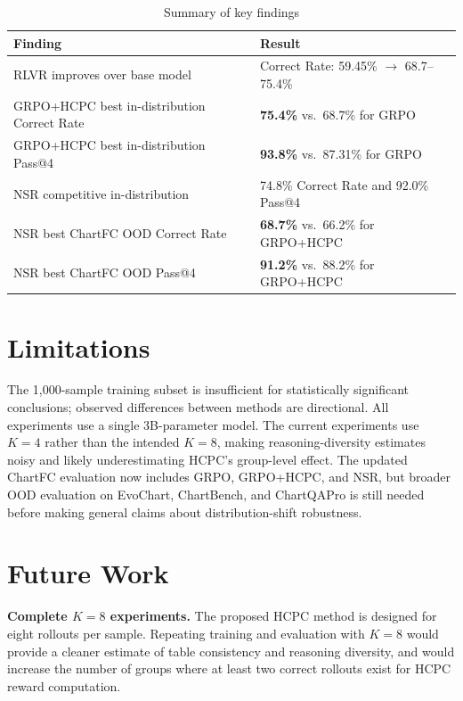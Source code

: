 \documentclass{iutbscthesis}
\begin{document}
\begin{table}[H]
    \centering
    \begin{tabular}{ll}
        \toprule
        Finding & Result \\
        \midrule
        RLVR improves over base model & Correct Rate: 59.45\% $\rightarrow$ 68.7--75.4\% \\
        GRPO+HCPC best in-distribution Correct Rate & \textbf{75.4\%} vs.\ 68.7\% for GRPO \\
        GRPO+HCPC best in-distribution Pass@4 & \textbf{93.8\%} vs.\ 87.31\% for GRPO \\
        NSR competitive in-distribution & 74.8\% Correct Rate and 92.0\% Pass@4 \\
        NSR best ChartFC OOD Correct Rate & \textbf{68.7\%} vs.\ 66.2\% for GRPO+HCPC \\
        NSR best ChartFC OOD Pass@4 & \textbf{91.2\%} vs.\ 88.2\% for GRPO+HCPC \\
        \bottomrule
    \end{tabular}
    \caption{Summary of key findings}
    \label{tab:summary}
\end{table}

\section{Limitations}

The 1,000-sample training subset is insufficient for statistically significant conclusions; observed differences between methods are directional. All experiments use a single 3B-parameter model. The current experiments use $K=4$ rather than the intended $K=8$, making reasoning-diversity estimates noisy and likely underestimating HCPC's group-level effect. The updated ChartFC evaluation now includes GRPO, GRPO+HCPC, and NSR, but broader OOD evaluation on EvoChart, ChartBench, and ChartQAPro is still needed before making general claims about distribution-shift robustness.

\section{Future Work}

\textbf{Complete $K=8$ experiments.} The proposed HCPC method is designed for eight rollouts per sample. Repeating training and evaluation with $K=8$ would provide a cleaner estimate of table consistency and reasoning diversity, and would increase the number of groups where at least two correct rollouts exist for HCPC reward computation.
\end{document}
